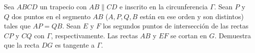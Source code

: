 Sea $ABCD$ un trapecio con $AB \parallel CD$ e inscrito en la circunferencia $\Gamma$. Sean $P$ y $Q$ dos puntos en el segmento $AB$ ($A,P,Q,B$ están en ese orden y son distintos) tales que $AP = QB$. Sean $E$ y $F$ los segundos puntos de intersección de las rectas $CP$ y $CQ$ con $\Gamma$, respectivamente. Las rectas $AB$ y $EF$ se cortan en $G$. Demuestra que la recta $DG$ es tangente a $\Gamma$.
